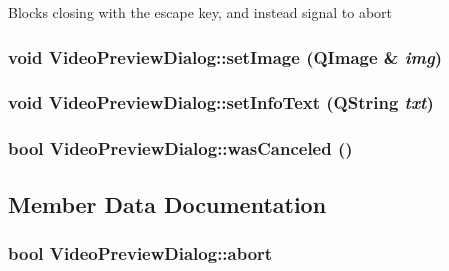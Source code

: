 Blocks closing with the escape key, and instead signal to abort \hypertarget{class_video_preview_dialog_7ea306a6fbef6a605138127be4093e1d}{
\subsubsection[{setImage}]{\setlength{\rightskip}{0pt plus 5cm}void VideoPreviewDialog::setImage (QImage \& {\em img})}}
\label{class_video_preview_dialog_7ea306a6fbef6a605138127be4093e1d}


\hypertarget{class_video_preview_dialog_caa7fff39bf4181a031686146c51047e}{
\subsubsection[{setInfoText}]{\setlength{\rightskip}{0pt plus 5cm}void VideoPreviewDialog::setInfoText (QString {\em txt})}}
\label{class_video_preview_dialog_caa7fff39bf4181a031686146c51047e}


\hypertarget{class_video_preview_dialog_74c26188fe035f144c3829780bd5c86a}{
\subsubsection[{wasCanceled}]{\setlength{\rightskip}{0pt plus 5cm}bool VideoPreviewDialog::wasCanceled ()}}
\label{class_video_preview_dialog_74c26188fe035f144c3829780bd5c86a}




\subsection{Member Data Documentation}
\hypertarget{class_video_preview_dialog_f1ef650168f8fcefbebd0b0f78ceb122}{
\subsubsection[{abort}]{\setlength{\rightskip}{0pt plus 5cm}bool {\bf VideoPreviewDialog::abort}}}
\label{class_video_preview_dialog_f1ef650168f8fcefbebd0b0f78ceb122}


